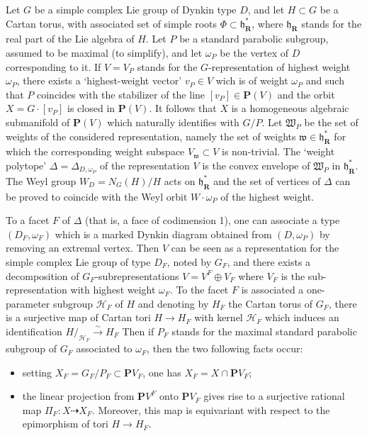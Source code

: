 \documentclass[11pt]{amsart}
\newcommand{\sk}{\smallskip}
\begin{document}
Let $G$ be a simple complex Lie group of Dynkin type $D$, and let $H\subset G$ be a Cartan torus, with associated set of simple roots $\Phi\subset \boldsymbol{\mathfrak h}^*_{\mathbf R}$, where $ \boldsymbol{\mathfrak h}_{\mathbf R}$ stands for the real part of the Lie algebra of $H$. Let $P$ be a standard parabolic subgroup, assumed to be maximal (to simplify), and let $\omega_P$ be the vertex of $D$ corresponding to it.
If $V=V_P$ stands for the $G$-representation of highest weight $\omega_P$, there exists a `highest-weight vector' $v_P\in V$ wich is of weight $\omega_P$ and such that $P$ coincides with the stabilizer of the line $[v_P]\in \mathbf P(V)$ and the orbit $X=G\cdot 
[v_P]$ is closed in $ \mathbf P(V)$. It follows that $X$ is a homogeneous algebraic submanifold of $ \mathbf P(V)$ which naturally identifies with $G/P$. Let $\mathfrak W_P$ be the set of weights of the considered representation, namely the set of 
weights  $\mathfrak w \in \boldsymbol{\mathfrak h}^*_{\mathbf R}$ 
for which the corresponding weight subspace $V_{\mathfrak w}\subset V$ is non-trivial. 
The `weight polytope' $\Delta=\Delta_{D,\omega_P}$ of the representation $V$ is the convex envelope of $\mathfrak W_P$ in $\boldsymbol{\mathfrak h}^*_{\mathbf R}$. The Weyl group $W_D=N_G(H)/H$ acts on  $\boldsymbol{\mathfrak h}_{\mathbf R}^*$ and the set of vertices of $\Delta$ can be proved to coincide with the Weyl orbit $W\!\cdot \!\omega_P$ of the highest weight.   \sk 

To a  facet $F$  of $\Delta$ (that is, a face of codimension 1), one can associate a type $(D_F,\omega_F)$ which is a marked Dynkin diagram obtained from $(D,\omega_P)$ by removing an extremal vertex.  Then $V$ can be seen as a representation
 for the  simple complex Lie group of type $D_F$, noted by $G_F$, and there exists a decomposition of
 $G_F$-subrepresentations $V=V^F\oplus V_F$ where $V_F$  is the sub-representation with highest weight $\omega_F$. To the facet $ F$ is associated a one-parameter subgroup $\mathcal H_F$ of $H$ and denoting by $H_F$ the Cartan torus of $G_F$,  there is a surjective map of Cartan tori $H\rightarrow H_F$  with kernel $\mathcal H_F$ which induces an identification $
 H/_{\mathcal H_F}\stackrel{\sim}{\rightarrow} H_F$
 Then if $P_F$ stands for the maximal standard parabolic subgroup 
of $G_F$ associated to $\omega_F$, then the two following facts occur: 
\begin{itemize}
\item[$(i).$]
setting $X_F=G_F/P_F\subset \mathbf PV_F$, one has $X_F=X\cap \mathbf PV_F$; \sk
\item[$(ii).$]
the linear  projection  from $\mathbf PV^F$ onto $\mathbf PV_F$ gives rise to a surjective rational map $\Pi_F : X\dashrightarrow X_F$. Moreover, this map is equivariant with respect to the epimorphism of tori $H\rightarrow H_F$.
\end{itemize}
\end{document}
